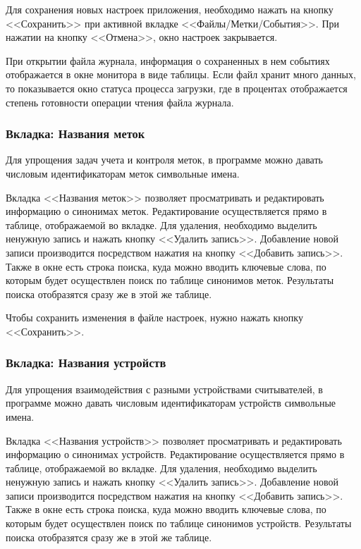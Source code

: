 Для сохранения новых настроек приложения, необходимо нажать на кнопку <<Сохранить>> при активной вкладке
<<Файлы/Метки/События>>. При нажатии на кнопку <<Отмена>>, окно настроек закрывается.

При открытии файла журнала, информация о сохраненных в нем событиях отображается в окне монитора в виде таблицы.
Если файл хранит много данных, то показывается окно статуса процесса загрузки, где в процентах отображается
степень готовности операции чтения файла журнала.  

\subsubsection{Вкладка: Названия меток}

Для упрощения задач учета и контроля меток, в программе можно давать числовым идентификаторам меток
символьные имена. 

Вкладка <<Названия меток>> позволяет просматривать и редактировать информацию о синонимах меток. 
Редактирование осуществляется прямо в таблице, отображаемой во вкладке. Для удаления, необходимо выделить ненужную 
запись и нажать кнопку <<Удалить запись>>. Добавление новой записи производится посредством нажатия на
кнопку <<Добавить запись>>. Также в окне есть строка поиска, куда можно вводить ключевые слова, по которым
будет осуществлен поиск по таблице синонимов меток. Результаты поиска отобразятся сразу же в этой же таблице.

Чтобы сохранить изменения в файле настроек, нужно нажать кнопку <<Сохранить>>.

\subsubsection{Вкладка: Названия устройств}

Для упрощения взаимодействия с разными устройствами считывателей, в программе можно давать числовым идентификаторам устройств
символьные имена. 

Вкладка <<Названия устройств>> позволяет просматривать и редактировать информацию о синонимах устройств. 
Редактирование осуществляется прямо в таблице, отображаемой во вкладке. Для удаления, необходимо выделить ненужную 
запись и нажать кнопку <<Удалить запись>>. Добавление новой записи производится посредством нажатия на
кнопку <<Добавить запись>>. Также в окне есть строка поиска, куда можно вводить ключевые слова, по которым
будет осуществлен поиск по таблице синонимов устройств. Результаты поиска отобразятся сразу же в этой же таблице.

